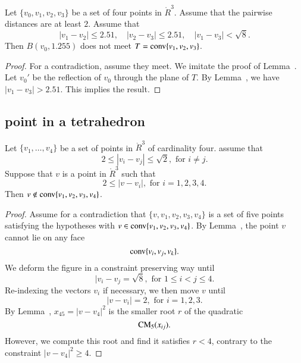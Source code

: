 \begin{lemma}
Let $\{v_0,v_1,v_2,v_3\}$ be a set of four points in $\ring{R}^3$.
Assume that the pairwise distances are at least $2$.  Assume
that
$$
   |v_1-v_2|\le 2.51,\quad |v_2-v_3|\le 2.51,\quad |v_1-v_3|<\sqrt8.
$$
Then $B(v_0,1.255)$ does not meet $T={\operatorname{conv}}\{v_1,v_2,v_3\}$.
\end{lemma}


\begin{proof}   For a contradiction, assume they meet. 
We imitate the proof of Lemma~.
Let $v_0'$ be the reflection of $v_0$ through the plane of $T$.
By
Lemma~, we have $|v_1-v_3|>2.51$.
This implies the result.
\end{proof}








\newpage
\subsection{point in a tetrahedron}

\begin{lemma} 
Let $\{v_1,\ldots,v_4\}$ be a set of points in $\ring{R}^3$ of cardinality four.
assume that 
	$$2 \le |v_i-v_j| \le \sqrt2, \text{ for } i\ne j.$$
Suppose that $v$  is a point in $\ring{R}^3$ such that 
	$$2\le |v - v_i|,\text { for } i=1,2,3,4.$$
Then $v\not\in {\operatorname{conv}}\{v_1,v_2,v_3,v_4\}$.
\end{lemma}


\begin{proof}  Assume for a contradiction that $\{v,v_1,v_2,v_3,v_4\}$ is a set
of five points satisfying the hypotheses with $v\in{\operatorname{conv}}\{v_1,v_2,v_3,v_4\}$.
By Lemma~, the point $v$ cannot lie on any face
	$${\operatorname{conv}}\{v_i,v_j,v_k\}.$$
We deform the figure in a constraint preserving way until 
	$$
	|v_i-v_j = \sqrt8,\text{ for } 1 \le i < j \le 4.
	$$
Re-indexing the vectors $v_i$ if necessary, we then move $v$ until
	$$
	|v-v_i| = 2, \text{ for } i=1,2,3.
	$$
By Lemma~, $x_{45}=|v-v_4|^2$ is the smaller root $r$ of the quadratic
	$${\operatorname{CM}}_5(x_{ij}).$$
However, we compute this root and find it satisfies $r < 4$, contrary to the
constraint $|v-v_4|^2 \ge 4$.
\end{proof}


